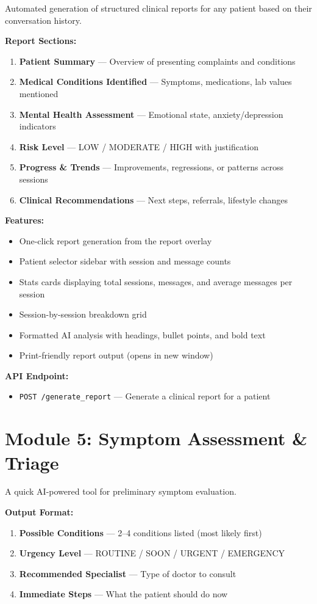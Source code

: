 \documentclass[12pt,a4paper]{report}
\begin{document}
Automated generation of structured clinical reports for any patient based on their conversation history.

\textbf{Report Sections:}
\begin{enumerate}
    \item \textbf{Patient Summary} --- Overview of presenting complaints and conditions
    \item \textbf{Medical Conditions Identified} --- Symptoms, medications, lab values mentioned
    \item \textbf{Mental Health Assessment} --- Emotional state, anxiety/depression indicators
    \item \textbf{Risk Level} --- LOW / MODERATE / HIGH with justification
    \item \textbf{Progress \& Trends} --- Improvements, regressions, or patterns across sessions
    \item \textbf{Clinical Recommendations} --- Next steps, referrals, lifestyle changes
\end{enumerate}

\textbf{Features:}
\begin{itemize}
    \item One-click report generation from the report overlay
    \item Patient selector sidebar with session and message counts
    \item Stats cards displaying total sessions, messages, and average messages per session
    \item Session-by-session breakdown grid
    \item Formatted AI analysis with headings, bullet points, and bold text
    \item Print-friendly report output (opens in new window)
\end{itemize}

\textbf{API Endpoint:}
\begin{itemize}
    \item \texttt{POST /generate\_report} --- Generate a clinical report for a patient
\end{itemize}

\section{Module 5: Symptom Assessment \& Triage}

A quick AI-powered tool for preliminary symptom evaluation.

\textbf{Output Format:}
\begin{enumerate}
    \item \textbf{Possible Conditions} --- 2--4 conditions listed (most likely first)
    \item \textbf{Urgency Level} --- ROUTINE / SOON / URGENT / EMERGENCY
    \item \textbf{Recommended Specialist} --- Type of doctor to consult
    \item \textbf{Immediate Steps} --- What the patient should do now
\end{enumerate}
\end{document}
